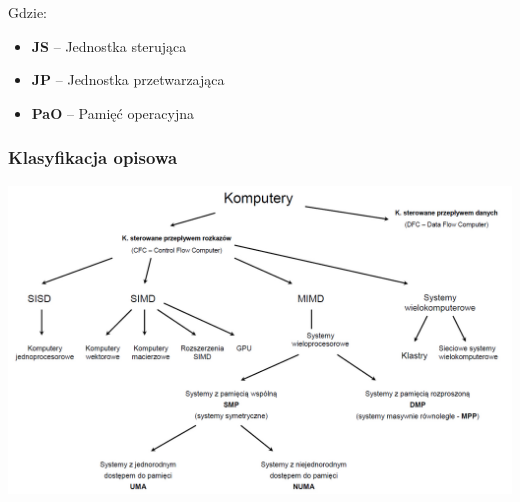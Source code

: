\documentclass[a4paper,twoside]{article}
\begin{document}
\begin{samepage}
\begin{itemize}
\begin{center}
		\end{center}
	\end{itemize}
	Gdzie:
	\begin{itemize}
		\item \textbf{JS} – Jednostka sterująca
		\item \textbf{JP} – Jednostka przetwarzająca
		\item \textbf{PaO} – Pamięć operacyjna
	\end{itemize}
\end{samepage}
\subsubsection{Klasyfikacja opisowa}
\includegraphics[width=16cm]{klasyfikacja}
\vfill

\end{document}
